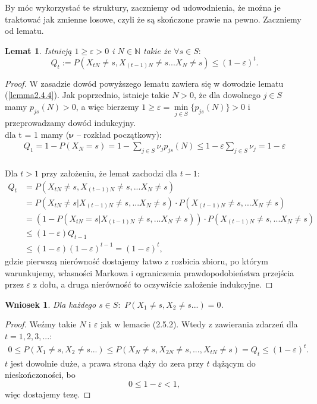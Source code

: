 \documentclass[a4paper]{article}
\theoremstyle{defn}
\theoremstyle{theorem}
\theoremstyle{lemma}
\newtheorem{lemma}[defn]{Lemat}
\theoremstyle{cor}
\newtheorem{cor}[defn]{Wniosek}
\theoremstyle{fact}
\begin{document}
By móc wykorzystać te struktury, zaczniemy od udowodnienia, że można je traktować jak zmienne losowe, czyli że są skończone prawie na pewno. Zaczniemy od lematu.
\begin{lemma}\label{lemma2.5.2}
Istnieją $1 \geq \varepsilon > 0$ i $N \in \mathbb{N}$ takie że $\forall s \in S:$ 
$$Q_t := P(X_{tN} \neq s, X_{(t-1)N} \neq s ... X_N \neq s) \leq (1-\varepsilon)^t.$$
\end{lemma}
\begin{proof}
W zasadzie dowód powyższego lematu zawiera się w dowodzie lematu (\ref{lemma2.4.4}). Jak poprzednio, istnieje takie $N > 0$, że dla dowolnego $j \in S$ mamy $p_{js}(N) > 0$, a więc bierzemy $1 \geq \varepsilon = \min\limits_{j \in S} \{p_{js}(N)\} > 0$ i przeprowadzamy dowód indukcyjny.\\
dla t = 1 mamy ($\boldsymbol{\nu}$ – rozkład początkowy):\\
\begin{align*}
Q_1 = 1 - P(X_N = s) = 1 - \sum _{j \in S} \nu_jp_{js}(N) \leq 1 - \varepsilon \sum _{j \in S} \nu_j = 1 - \varepsilon
\end{align*}
\\
Dla $t > 1$ przy założeniu, że lemat zachodzi dla $t-1$:
\begin{align*}
Q_{t} &= P(X_{tN} \neq s, X_{(t-1)N} \neq s, ... X_N \neq s) \\
&= P(X_{tN} \neq s | X_{(t-1)N} \neq s, ... X_N \neq s) \cdot P(X_{(t-1)N} \neq s, ... X_N \neq s) \\
&= (1 - P(X_{tN} = s | X_{(t-1)N} \neq s, ... X_N \neq s)) \cdot P(X_{(t-1)N} \neq s, ... X_N \neq s) \\
&\leq (1-\varepsilon) Q_{t-1}   \\
&\leq  (1-\varepsilon)(1-\varepsilon)^{t-1} = (1-\varepsilon)^t ,
\end{align*}
gdzie pierwszą nierówność dostajemy łatwo z rozbicia zbioru, po którym warunkujemy, własności Markowa i ograniczenia prawdopodobieństwa przejścia  przez $\varepsilon$ z dołu, a druga nierówność to oczywiście założenie indukcyjne.
\end{proof}
\begin{cor}\label{cor2.5.3}
Dla każdego $s \in S: \,\, P(X_{1} \neq s, X_2 \neq s ...) = 0$.
\end{cor}
\begin{proof}
Weźmy takie $N$ i $\varepsilon$ jak w lemacie (2.5.2). Wtedy z zawierania zdarzeń dla $t = 1,2,3,...$:
\begin{align*}
0 \leq P(X_{1} \neq s, X_2 \neq s ...) \leq P(X_N \neq s, X_{2N} \neq s, ..., X_{tN} \neq s) = Q_t \leq (1-\varepsilon)^t.
\end{align*}
$t$ jest dowolnie duże, a prawa strona dąży do zera przy $t$ dążącym do nieskończoności, bo $$0 \leq 1 - \varepsilon < 1,$$ więc dostajemy tezę.
\end{proof}
\end{document}
